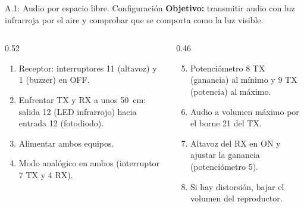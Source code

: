 \documentclass[aspectratio=169,10pt]{beamer}
\begin{document}
\begin{frame}{A.1: Audio por espacio libre. Configuración}
  \textbf{Objetivo:} transmitir audio con luz infrarroja por el aire y comprobar que se comporta como la luz visible.

  \medskip
  \small
  \begin{columns}[T]
    \begin{column}{0.52\textwidth}
      \begin{enumerate}
        \item Receptor: interruptores 11 (altavoz) y 1 (buzzer) en OFF.
        \item Enfrentar TX y RX a unos 50~cm: salida 12 (LED infrarrojo) hacia entrada 12 (fotodiodo).
        \item Alimentar ambos equipos.
        \item {Modo analógico} en ambos (interruptor 7 TX y 4 RX).
      \end{enumerate}
    \end{column}
    \begin{column}{0.46\textwidth}
      \begin{enumerate}
        \setcounter{enumi}{4}
        \item Potenciómetro 8 TX (ganancia) al mínimo y 9 TX (potencia) al máximo.
        \item Audio a volumen máximo por el borne 21 del TX.
        \item Altavoz del RX en ON y ajustar la ganancia (potenciómetro 5).
        \item Si hay distorsión, bajar el volumen del reproductor.
      \end{enumerate}
    \end{column}
  \end{columns}
\end{frame}
\end{document}
